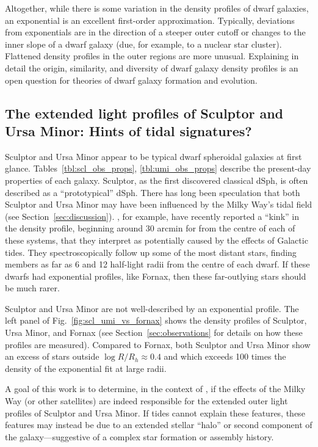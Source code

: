Altogether, while there is some variation in the density profiles of
dwarf galaxies, an exponential is an excellent first-order
approximation. Typically, deviations from exponentials are in the
direction of a steeper outer cutoff or changes to the inner slope of a
dwarf galaxy (due, for example, to a nuclear star cluster). Flattened
density profiles in the outer regions are more unusual. Explaining in
detail the origin, similarity, and diversity of dwarf galaxy density
profiles is an open question for theories of dwarf galaxy formation and
evolution.

\subsection{The extended light profiles of Sculptor and Ursa Minor:
Hints of tidal
signatures?}\label{the-extended-light-profiles-of-sculptor-and-ursa-minor-hints-of-tidal-signatures}

Sculptor and Ursa Minor appear to be typical dwarf spheroidal galaxies
at first glance. Tables~\ref{tbl:scl_obs_props}, \ref{tbl:umi_obs_props}
describe the present-day properties of each galaxy. Sculptor, as the
first discovered classical dSph, is often described as a
``prototypical'' dSph. There has long been speculation that both
Sculptor and Ursa Minor may have been influenced by the Milky Way's
tidal field (see Section~\ref{sec:discussion}).
\citet{sestito+2023a, sestito+2023b}, for example, have recently
reported a ``kink'' in the density profile, beginning around 30 arcmin
for from the centre of each of these systems, that they interpret as
potentially caused by the effects of Galactic tides. They
spectroscopically follow up some of the most distant stars, finding
members as far as 6 and 12 half-light radii from the centre of each
dwarf. If these dwarfs had exponential profiles, like Fornax, then these
far-outlying stars should be much rarer.

Sculptor and Ursa Minor are not well-described by an exponential
profile. The left panel of Fig.~\ref{fig:scl_umi_vs_fornax} shows the
density profiles of Sculptor, Ursa Minor, and Fornax (see
Section~\ref{sec:observations} for details on how these profiles are
measured). Compared to Fornax, both Sculptor and Ursa Minor show an
excess of stars outside \(\log R/R_h\approx 0.4\) and which exceeds 100
times the density of the exponential fit at large radii.

A goal of this work is to determine, in the context of \LCDM{}, if the
effects of the Milky Way (or other satellites) are indeed responsible
for the extended outer light profiles of Sculptor and Ursa Minor. If
tides cannot explain these features, these features may instead be due
to an extended stellar ``halo'' or second component of the
galaxy---suggestive of a complex star formation or assembly history.

